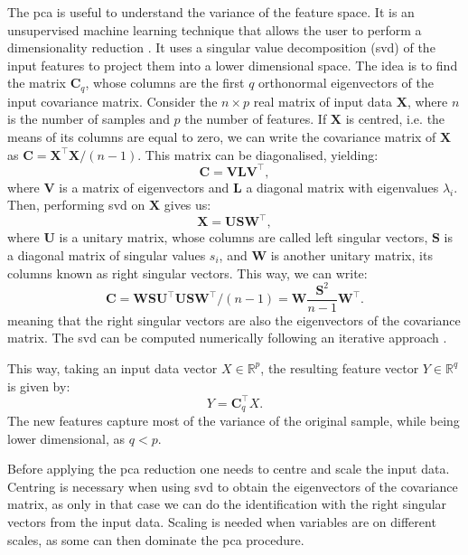 The \gls{pca} is useful to understand the variance of the feature space. It is an unsupervised machine learning technique that allows the user to perform a dimensionality reduction \cite{Jolliffe2016}. It uses a singular value decomposition (\gls{svd}) of the input features to project them into a lower dimensional space. The idea is to find the matrix $\mathbf{C}_{q}$, whose columns are the first $q$ orthonormal eigenvectors of the input covariance matrix. Consider the $n \times p$ real matrix of input data $\mathbf{X}$, where $n$ is the number of samples and $p$ the number of features. If $\mathbf{X}$ is centred, i.e. the means of its columns are equal to zero, we can write the covariance matrix of $\mathbf{X}$ as $\mathbf{C}=\mathbf{X}^{\intercal}\mathbf{X}/(n-1)$. This matrix can be diagonalised, yielding:
\begin{equation}
	\mathbf{C}=\mathbf{V}\mathbf{L}\mathbf{V}^{\intercal},
\end{equation}
where $\mathbf{V}$ is a matrix of eigenvectors and $\mathbf{L}$ a diagonal matrix with eigenvalues $\lambda_{i}$. Then, performing \gls{svd} on $\mathbf{X}$ gives us:
\begin{equation}
	\mathbf{X}=\mathbf{U}\mathbf{S}\mathbf{W}^{\intercal},
\end{equation}
where $\mathbf{U}$ is a unitary matrix, whose columns are called left singular vectors, $\mathbf{S}$ is a diagonal matrix of singular values $s_{i}$, and $\mathbf{W}$ is another unitary matrix, its columns known as right singular vectors. This way, we can write:
\begin{equation}
	\mathbf{C}=\mathbf{W}\mathbf{S}\mathbf{U}^{\intercal}\mathbf{U}\mathbf{S}\mathbf{W}^{\intercal}/(n-1)=\mathbf{W}\frac{\mathbf{S}^{2}}{n-1}\mathbf{W}^{\intercal}.
\end{equation}
meaning that the right singular vectors are also the eigenvectors of the covariance matrix. The \gls{svd} can be computed numerically following an iterative approach \cite{Golub1970}.

This way, taking an input data vector $X \in \mathbb{R}^{p}$, the resulting feature vector $Y \in \mathbb{R}^{q}$ is given by:
\begin{equation}
	Y = \mathbf{C}_{q}^{\intercal} X.
\end{equation}
The new features capture most of the variance of the original sample, while being lower dimensional, as $q<p$.

Before applying the \gls{pca} reduction one needs to centre and scale the input data. Centring is necessary when using \gls{svd} to obtain the eigenvectors of the covariance matrix, as only in that case we can do the identification with the right singular vectors from the input data. Scaling is needed when variables are on different scales, as some can then dominate the \gls{pca} procedure.

